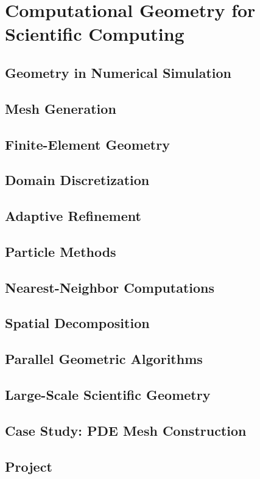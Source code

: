 \chapter{Computational Geometry for Scientific Computing}
\label{ch:applications_scientific}


\section{Geometry in Numerical Simulation}
\label{sec:scientific_simulation}

\section{Mesh Generation}
\label{sec:scientific_mesh_generation}

\section{Finite-Element Geometry}
\label{sec:scientific_fem}

\section{Domain Discretization}
\label{sec:scientific_discretization}

\section{Adaptive Refinement}
\label{sec:scientific_adaptive}

\section{Particle Methods}
\label{sec:scientific_particles}

\section{Nearest-Neighbor Computations}
\label{sec:scientific_nearest_neighbor}

\section{Spatial Decomposition}
\label{sec:scientific_decomposition}

\section{Parallel Geometric Algorithms}
\label{sec:scientific_parallel}

\section{Large-Scale Scientific Geometry}
\label{sec:scientific_large_scale}

\section{Case Study: PDE Mesh Construction}
\label{sec:scientific_case_study}

\section{Project}
\label{sec:scientific_project}
